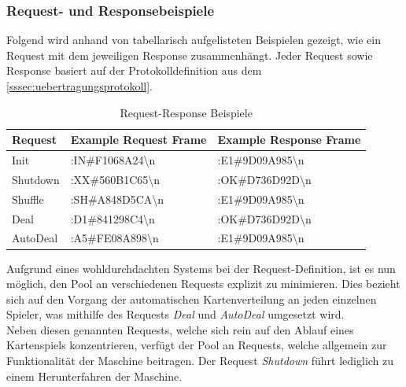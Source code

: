 \subsubsection{Request- und Responsebeispiele}
Folgend wird anhand von tabellarisch aufgelisteten Beispielen gezeigt, wie ein Request mit dem jeweiligen Response zusammenhängt.
Jeder Request sowie Response basiert auf der Protokolldefinition aus dem \autoref{sssec:uebertragungsprotokoll}.
\begin{table}[]
    \centering
    \begin{tabular}{|l|l|l|}
        \hline
        {\color[HTML]{333333} \textbf{Request}} & {\color[HTML]{333333} \textbf{Example Request Frame}} & {\color[HTML]{333333} \textbf{Example Response Frame}} \\ \hline
        {\color[HTML]{333333} Init}             & {\color[HTML]{333333} :IN\#F1068A24\textbackslash{}n} & {\color[HTML]{333333} :E1\#9D09A985\textbackslash{}n}  \\ \hline
        {\color[HTML]{333333} Shutdown}         & {\color[HTML]{333333} :XX\#560B1C65\textbackslash{}n} & {\color[HTML]{333333} :OK\#D736D92D\textbackslash{}n}  \\ \hline
        {\color[HTML]{333333} Shuffle}          & {\color[HTML]{333333} :SH\#A848D5CA\textbackslash{}n} & {\color[HTML]{333333} :E1\#9D09A985\textbackslash{}n}  \\ \hline
        {\color[HTML]{333333} Deal}             & {\color[HTML]{333333} :D1\#841298C4\textbackslash{}n} & {\color[HTML]{333333} :OK\#D736D92D\textbackslash{}n}  \\ \hline
        {\color[HTML]{333333} \acs{AutoDeal}}         & {\color[HTML]{333333} :A5\#FE08A898\textbackslash{}n} & {\color[HTML]{333333} :E1\#9D09A985\textbackslash{}n}  \\ \hline
    \end{tabular}
    \caption{Request-Response Beispiele}
\end{table}
Aufgrund eines wohldurchdachten Systems bei der Request-Definition, ist es nun möglich, den Pool an verschiedenen Requests explizit zu minimieren.
Dies bezieht sich auf den Vorgang der automatischen Kartenverteilung an jeden einzelnen Spieler, was mithilfe des Requests \textit{Deal} und \textit{AutoDeal} umgesetzt wird.\\
Neben diesen genannten Requests, welche sich rein auf den Ablauf eines Kartenspiels konzentrieren, verfügt der Pool an Requests, welche allgemein zur Funktionalität der Maschine beitragen.
Der Request \textit{Shutdown} führt lediglich zu einem Herunterfahren der Maschine.
